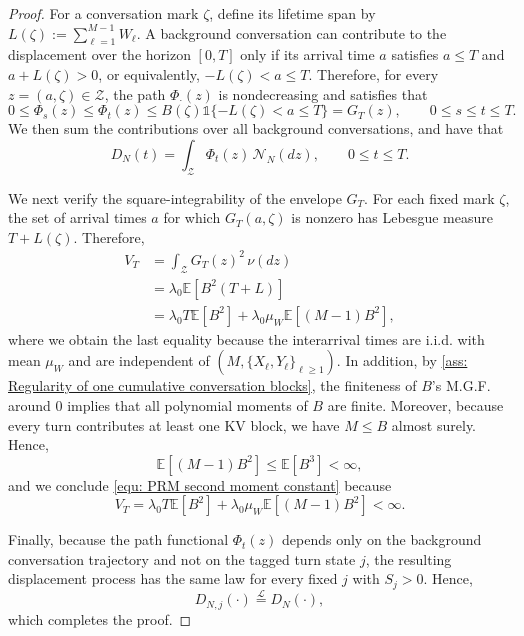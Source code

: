 \documentclass{article}
\theoremstyle{definition}
\newcommand{\E}{\mathbb E}
\newcommand{\one}{\mathds{1}}
\begin{document}
\begin{proof}
For a conversation mark $\zeta$, define its lifetime span by $L(\zeta):=\sum_{\ell=1}^{M-1}W_\ell.$ A background conversation can contribute to the displacement over the horizon $[0,T]$ only if its arrival time $a$ satisfies $a\leq T$ and $a+L(\zeta)>0$, or equivalently, $-L(\zeta)<a\leq T$. Therefore, for every $z=(a,\zeta)\in\mathcal Z$, the path $\Phi_\cdot(z)$ is nondecreasing and satisfies that
\begin{equation*}
    0\leq\Phi_s(z)\leq\Phi_t(z)\leq B(\zeta)\one\{-L(\zeta)<a\leq T\}=G_T(z), \qquad 0\leq s\leq t\leq T.
\end{equation*}
We then sum the contributions over all background conversations, and have that
\begin{equation*}
    D_N(t)=\int_{\mathcal Z}\Phi_t(z)\,\mathcal N_N(dz), \qquad 0\leq t\leq T.
\end{equation*}

We next verify the square-integrability of the envelope $G_T$. 
For each fixed mark $\zeta$, the set of arrival times $a$ for which $G_T(a,\zeta)$ is nonzero has Lebesgue measure $T+L(\zeta)$. Therefore,
\begin{align*}
    V_T &=\int_{\mathcal Z}G_T(z)^2\,\nu(dz)\\
    &=\lambda_0\E\left[B^2(T+L)\right]\\
    &=\lambda_0T\E[B^2]+\lambda_0\mu_W\E[(M-1)B^2],
\end{align*}
where we obtain the last equality because the interarrival times are i.i.d. with mean $\mu_W$ and are independent of $(M,\{X_\ell,Y_\ell\}_{\ell\geq1})$. In addition, by \cref{ass: Regularity of one cumulative conversation blocks}, the finiteness of $B$'s M.G.F. around $0$ implies that all polynomial moments of $B$ are finite. Moreover, because every turn contributes at least one KV block, we have $M\leq B$ almost surely. Hence, 
\begin{equation*}
    \E[(M-1)B^2]\leq\E[B^3]<\infty,
\end{equation*}
and we conclude \eqref{equ: PRM second moment constant} because
\begin{equation*}
    V_T=\lambda_0T\E[B^2]+\lambda_0\mu_W\E[(M-1)B^2]<\infty.
\end{equation*}

Finally, because the path functional $\Phi_t(z)$ depends only on the background conversation trajectory and not on the tagged turn state $j$, the resulting displacement process has the same law for every fixed $j$ with $S_j>0$. Hence,
\begin{equation*}
    D_{N,j}(\cdot)\stackrel{\mathcal L}{=}D_N(\cdot),
\end{equation*}
which completes the proof.
\end{proof}
\end{document}
